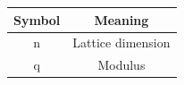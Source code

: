 \begin{tabular}{cc}
\hline
Symbol & Meaning \\
\hline
n & Lattice dimension \\
q & Modulus \\
\hline
\end{tabular}
